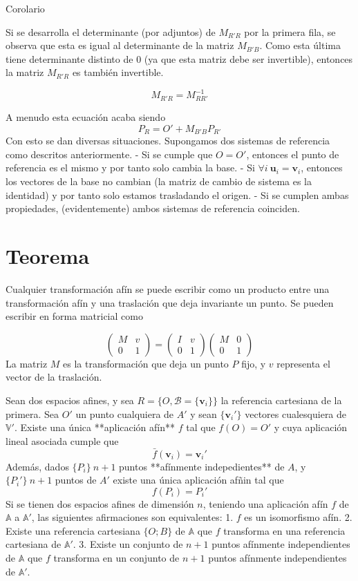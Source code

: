 \documentclass{./Geometria.tex}
\begin{document}
\begin{teorema}
Corolario

Si se desarrolla el determinante (por adjuntos) de $M_{R'R}$ por la primera fila, se observa que esta es igual al determinante de la matriz $M_{B'B}$. Como esta última tiene determinante distinto de $0$ (ya que esta matriz debe ser invertible), entonces la matriz $M_{R'R}$ es también invertible.

$$
M_{R'R}=M_{R R'}^{-1}
$$
\end{teorema}

A menudo esta ecuación acaba siendo
$$
P_{R}=O'+M_{B'B}P_{R'}
$$
Con esto se dan diversas situaciones. Supongamos dos sistemas de referencia como descritos anteriormente.
- Si se cumple que $O=O'$, entonces el punto de referencia es el mismo y por tanto solo cambia la base.
- Si $\forall i~\mathbf{u}_{i}=\mathbf{v}_{i}$, entonces los vectores de la base no cambian (la matriz de cambio de sistema es la identidad) y por tanto solo estamos trasladando el origen.
- Si se cumplen ambas propiedades, (evidentemente) ambos sistemas de referencia coinciden.

\section{Teorema}
Cualquier transformación afín se puede escribir como un producto entre una transformación afín y una traslación que deja invariante un punto. Se pueden escribir en forma matricial como

$$
\begin{pmatrix}
M & v \\
0 & 1
\end{pmatrix}=
\begin{pmatrix}
I & v \\
0 & 1
\end{pmatrix}
\begin{pmatrix}
M & 0 \\
0 & 1
\end{pmatrix}
$$
La matriz $M$ es la transformación que deja un punto $P$ fijo, y $v$ representa el vector de la traslación.

Sean dos espacios afines, y sea $R=\{ O,\mathcal{B}=\{ \mathbf{v}_{i} \} \}$ la referencia cartesiana de la primera. Sea $O'$ un punto cualquiera de $A'$ y sean $\{ \mathbf{v}_{i}' \}$ vectores cualesquiera de $\mathbb{V}'$.
Existe una única **aplicación afín** $f$ tal que $f(O)=O'$ y cuya aplicación lineal asociada cumple que
$$
\bar{f}(\mathbf{v}_{i})=\mathbf{v}_{i}'
$$
Además, dados $\{ P_{i} \}~n+1$ puntos **afínmente indepedientes** de $A$, y $\{ P_{i}' \}~n+1$ puntos de $A'$ existe una única aplicación afñin tal que
$$
f(P_{i})=P_{i}'
$$
Si se tienen dos espacios afines de dimensión $n$, teniendo una aplicación afín $f$ de $\mathbb{A}$ a $\mathbb{A'}$, las siguientes afirmaciones son equivalentes:
1. $f$ es un isomorfismo afín.
2. Existe una referencia cartesiana $\{ O;B \}$ de $\mathbb{A}$ que $f$ transforma en una referencia cartesiana de $\mathbb{A}'$.
3. Existe un conjunto de $n+1$ puntos afínmente independientes de $\mathbb{A}$ que $f$ transforma en un conjunto de $n+1$ puntos afínmente independientes de $\mathbb{A}'$.
\end{document}

